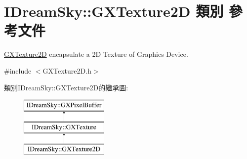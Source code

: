 \hypertarget{class_i_dream_sky_1_1_g_x_texture2_d}{}\section{I\+Dream\+Sky\+:\+:G\+X\+Texture2D 類別 參考文件}
\label{class_i_dream_sky_1_1_g_x_texture2_d}


\hyperlink{class_i_dream_sky_1_1_g_x_texture2_d}{G\+X\+Texture2D} encapsulate a 2D Texture of Graphics Device.  




{\ttfamily \#include $<$G\+X\+Texture2\+D.\+h$>$}

類別\+I\+Dream\+Sky\+:\+:G\+X\+Texture2\+D的繼承圖\+:\begin{figure}[H]
\begin{center}
\leavevmode
\includegraphics[height=3.000000cm]{class_i_dream_sky_1_1_g_x_texture2_d}
\end{center}
\end{figure}
